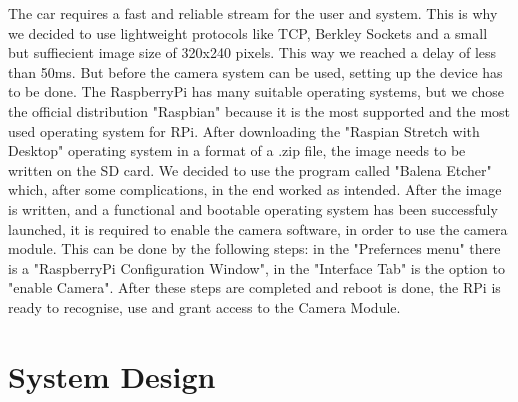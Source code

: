 \documentclass[conference]{IEEEtran}
\begin{document}
The car requires a fast and reliable stream for the user and system. This is why we decided to use lightweight protocols like TCP, Berkley Sockets and a small but suffiecient image size of 320x240 pixels. This way we reached a delay of less than 50ms. But before the camera system can be used, setting up the device has to be done. The RaspberryPi has many suitable operating systems, but we chose the official distribution "Raspbian" because it is the most supported and the most used operating system for RPi. After downloading the "Raspian Stretch with Desktop" operating system in a format of a .zip file, the image needs to be written on the SD card. We decided to use the program called "Balena Etcher" which, after some complications, in the end worked as intended. After the image is written, and a functional and bootable operating system has been successfuly launched, it is required to enable the camera software, in order to use the camera module. This can be done by the following steps: in the "Prefernces menu" there is a "RaspberryPi Configuration Window", in the "Interface Tab" is the option to "enable Camera". After these steps are completed and reboot is done, the RPi is ready to recognise, use and grant access to the Camera Module.

\section{System Design}
\end{document}
